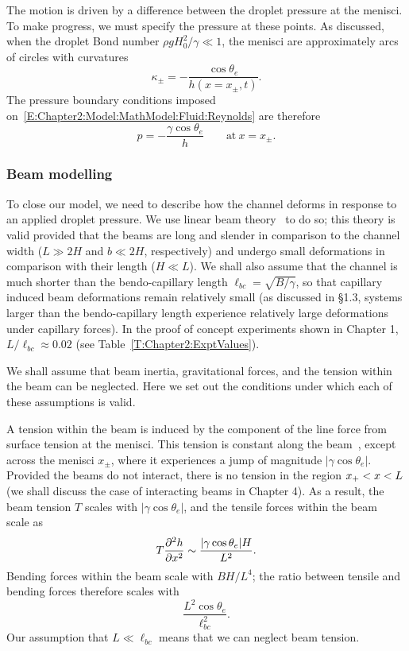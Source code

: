 The motion is driven by a difference between the droplet pressure at the menisci. To make progress, we must specify the pressure at these points. As discussed, when the droplet Bond number $\rho g H_0^2/ \gamma \ll 1$, the menisci are approximately arcs of circles with curvatures
\begin{equation}\label{E:Chapter2:Model:MathModel:Fluid:Curvatures}
\kappa_{\pm} = -\frac{\cos \theta_e}{h(x = x_\pm,t)}.
\end{equation}
The pressure boundary conditions imposed on~\eqref{E:Chapter2:Model:MathModel:Fluid:Reynolds} are therefore
\begin{equation}\label{E:Chapter2:Model:MathModel:Fluid:PressureBC}
p =- \frac{\gamma \cos \theta_e}{h} \qquad \text{at}~x = x_{\pm}.
\end{equation}


\subsubsection{Beam modelling}\label{S:Model:MathModel:BeamModelling}
To close our model, we need to describe how the channel deforms in response to an applied droplet pressure. We use linear beam theory~\citep{Howell2009} to do so; this theory is valid provided that the beams are long and slender in comparison to the channel width ($L \gg 2H$ and $b \ll 2H$, respectively) and undergo small deformations in comparison with their length ($H \ll L$). We shall also assume that the channel is much shorter than the bendo-capillary length $\ell_{bc} = \sqrt{B/\gamma}$, so that capillary induced beam deformations remain relatively small (as discussed in \S1.3, systems larger than the bendo-capillary length experience relatively large deformations under capillary forces). In the proof of concept experiments shown in Chapter 1, $L/\ell_{bc} \approx 0.02$ (see Table~\ref{T:Chapter2:ExptValues}).

We shall assume that beam inertia, gravitational forces, and the tension within the beam can be neglected. Here we set out the conditions under which each of these assumptions is valid.

A tension within the beam is induced by the component of the line force from surface tension at the menisci. This tension is constant along the beam~\citep{Howell2009}, except across the menisci $x_{\pm}$, where it experiences a jump of magnitude $|\gamma \cos \theta_e|$. Provided the beams do not interact, there is no tension in the region $x_{+} < x < L$ (we shall discuss the case of interacting beams in Chapter 4). As a result, the beam tension $T$ scales with $|\gamma \cos \theta_e|$, and the tensile forces within the beam~\citep{Howell2009} scale as
\begin{equation}
T\frac{\partial ^2 h}{\partial x^2} \sim \frac{| \gamma  \cos \theta_e|H}{L^2}.
\end{equation}
Bending forces within the beam scale with $B H/L^4$; the ratio between tensile and bending forces therefore scales with
\begin{equation}
\frac{L^2 \cos \theta_e}{\ell_{bc}^2}.
\end{equation}
Our assumption that $L \ll \ell_{bc}$ means that we can neglect beam tension.

